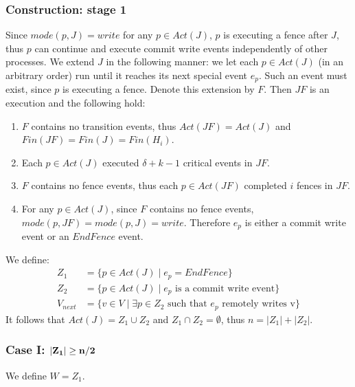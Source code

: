 \subsubsection{Construction: stage 1}
Since $mode(p,J) = write$ for any $p \in Act(J)$, $p$ is executing a fence after $J$, thus $p$ can continue and execute commit write events independently of other processes. We extend $J$ in the following manner: we let each $p \in Act(J)$ (in an arbitrary order) run until it reaches its next special event $e_p$. Such an event must exist, since $p$ is executing a fence. Denote this extension by $F$. Then $J F$ is an execution and the following hold:
\begin{enumerate}
	\item $F$ contains no transition events, thus $Act(J F) = Act(J)$ and $Fin(J F) = Fin(J) = Fin(H_i)$.
	\item Each $p \in Act(J)$ executed $\delta+k-1$ critical events in $J F$.
	\item $F$ contains no fence events, thus each $p \in Act(J F)$ completed $i$ fences in $J F$.
	\item For any $p \in Act(J)$, since $F$ contains no fence events, $mode(p,J F) = mode(p,J) = write$. Therefore $e_p$ is either a commit write event or an $EndFence$ event.
	
\end{enumerate}

We define:
\begin{align*}
Z_1 &= \{p \in Act(J) \mid e_p = EndFence\} \\
Z_2 &= \{p \in Act(J) \mid e_p \text{ is a commit write event}\} \\
V_{next} &= \{v \in V \mid \exists p \in Z_2 \text{ such that } e_p \text{ remotely writes v}\}
\end{align*}
It follows that $Act(J) = Z_1 \cup Z_2$ and $Z_1 \cap Z_2 = \emptyset$, thus $n = |Z_1|+|Z_2|$.

\subsubsection*{\hspace{5mm} Case I: $\bf |Z_1| \geq n/2$}
We define $W = Z_1$.

